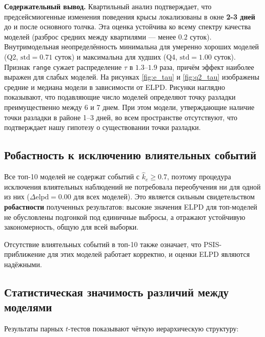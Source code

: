 \documentclass[14pt]{mmcs_article}
\begin{document}
\textbf{Содержательный вывод.}
Квартильный анализ подтверждает, что предсейсмиогенные изменения поведения крысы локализованы в окне \textbf{2-3  дней} до и после основного
толчка. Эта оценка устойчива ко всему спектру качества моделей
(разброс средних между квартилями — менее $0.2$ суток).
Внутримодельная неопределённость минимальна для умеренно
хороших моделей (Q2, $\mathrm{std} = 0.71$ суток) и
максимальна для худших (Q4, $\mathrm{std} = 1.00$ суток).
Признак \texttt{range} сужает распределение $\tau$ в
$1.3$--$1.9$ раза, причём эффект наиболее выражен для слабых
моделей. На рисунках \ref{fig:e_tau} и \ref{fig:q2_tau} изображены средние и медиана модели в зависимости от ELPD. Рисунки наглядно показывают, что подавляющие число моделей определяют точку разладки преимущественно между 6 и 7 днем. При этом модели, утверждающие наличие точки разладки в районе 1--3 дней, во всем пространстве отсутствуют, что подтверждает нашу гипотезу о существовании точки разладки.

\subsection{Робастность к исключению влиятельных \linebreak событий}

Все топ-10 моделей не содержат событий с
$\hat{k}_e \geq 0.7$, поэтому процедура исключения
влиятельных наблюдений не потребовала переобучения ни для
одной из них ($\Delta\mathrm{elpd} = 0.00$ для всех
моделей). Это является сильным свидетельством
\textbf{робастности} полученных результатов: высокие
значения ELPD для топ-моделей не обусловлены подгонкой под
единичные выбросы, а отражают устойчивую закономерность,
общую для всей выборки.

Отсутствие влиятельных событий в топ-10 также означает, что
PSIS-приближение для этих моделей работает корректно, и
оценки ELPD являются надёжными.

\subsection{Статистическая значимость различий между моделями}
\label{sec:paired_ttest}

Результаты парных $t$-тестов показывают чёткую иерархическую
структуру:
\end{document}
